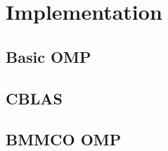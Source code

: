 
\section{Implementation}
\label{sec:implementation}


\subsection{Basic OMP}
\label{subsec:basic-omp}


\FloatBarrier
\subsection{CBLAS}
\label{subsec:cblas}


\FloatBarrier
\subsection{BMMCO OMP}
\label{subsec:bmmco-omp}


\begin{comment}

\begin{itemize}
    \item Another way to look at this section is as a paper, within a paper, describing your implementation. That viewpoint makes this the introduction to the subordinate paper, which should describe the overall structure of your implementation and how it is designed to address the problem effectively.
\item Then, describe the structure of the rest of this section, and what each subsection describes.
\end{itemize}

How our solution (will | does) work
\begin{itemize}
    \item This is the body of the subordinate paper describing your solution. It may be divided into several subsections as required by the nature of your implementation.
    \item The level of detail about how the solution works is determined by what is appropriate to the type of paper (conference, journal, technical report).
    \item This section can be fairly short for conference papers, fairly long for journal papers, or quite long in technical reports. It all depends on the purpose of the paper and the target audience.
    \item Proposals are necessarily a good deal more vague in this section since you have to convince someone you know enough to have a good chance of building a solution, but that you have not already done so.
\end{itemize}

\end{comment}
